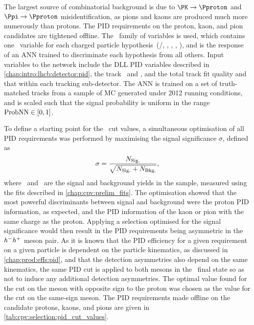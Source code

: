 The largest source of combinatorial background is due to $\PK \to \Pproton$ and
$\Ppi \to \Pproton$ misidentification, as pions and kaons are produced much
more numerously than protons.
The \ac{PID} requirements on the proton, kaon, and pion candidates are
tightened offline.
The \probnn\ family of variables is used, which contains one \probnn\ variable
for each charged particle hypothesis~(\Pproton/\APproton, \PKpm, \Ppipm,
\Pmupm, \Pepm), and is the response of an \ac{ANN} trained to discriminate each
hypothesis from all others.
Input variables to the network include the \ac{DLL} \ac{PID} variables
described in \cref{chap:intro:lhcb:detector:pid}, the track \ptot\ and \pT, and
the total track fit quality and that within each tracking sub-detector.
The \ac{ANN} is trained on a set of truth-matched tracks from a sample of
\ac{MC} generated under 2012 running conditions, and is scaled such that the
signal probability is uniform in the range $\text{ProbNN} \in [0, 1]$.

To define a starting point for the \probnn\ cut values, a simultaneous
optimisation of all \ac{PID} requirements was performed by maximising the
signal significance $\sigma$, defined as
\begin{equation}
  \sigma = \frac{%
    \nsig
  }{%
    \sqrt{\nsig + \nbkg}
  },
  \label{eqn:cpv:selection:signal_significance}
\end{equation}
where \nsig\ and \nbkg\ are the signal and background yields in the sample,
measured using the fits described in \cref{chap:cpv:prelim_fits}.
The optimisation showed that the most powerful discriminants between signal and
background were the proton \ac{PID} information, as expected, and the \ac{PID}
information of the kaon or pion with the same charge as the proton.
Applying a selection optimised for the signal significance would then result in
the \ac{PID} requirements being asymmetric in the $h^{-}h^{+}$ meson pair.
As it is known that the \ac{PID} efficiency for a given requirement on a given
particle is dependent on the particle kinematics, as discussed in
\cref{chap:prod:effs:pid}, and that the detection asymmetries also depend on
the same kinematics, the same \ac{PID} cut is applied to both mesons in the
\PLambdac\ final state so as not to induce any additional detection
asymmetries.
The optimal value found for the cut on the meson with opposite sign to the
proton was chosen as the value for the cut on the same-sign meson.
The \ac{PID} requirements made offline on the candidate protons, kaons, and
pions are given in \cref{tab:cpv:selection:pid_cut_values}.

